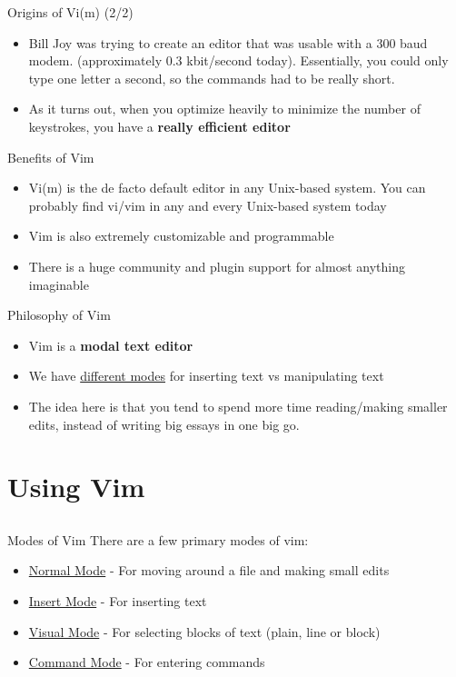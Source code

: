 \documentclass[12pt]{beamer}
\begin{document}
\begin{frame}{Origins of Vi(m) (2/2)}
    \begin{itemize}
        \item Bill Joy was trying to create an editor that was usable with a 300 baud modem. (approximately 0.3 kbit/second today). Essentially, you could only type one letter a second, so the commands had to be really short.
        \item As it turns out, when you optimize heavily to minimize the number of keystrokes, you have a
              \textbf{really efficient editor}
    \end{itemize}{}
\end{frame}{}

\begin{frame}{Benefits of Vim}
    \begin{itemize}
        \item Vi(m) is the de facto default editor in any Unix-based system. You can probably find vi/vim in
              any and every Unix-based system today
        \item Vim is also extremely customizable and programmable
        \item There is a huge community and plugin support for almost anything imaginable
    \end{itemize}{}
\end{frame}{}

\begin{frame}{Philosophy of Vim}
    \begin{itemize}
        \item Vim is a \textbf{modal text editor}
        \item We have \underline{different modes} for inserting text vs manipulating text
        \item The idea here is that you tend to spend more time reading/making smaller edits, instead of
              writing big essays in one big go.
    \end{itemize}{}
\end{frame}{}

\section{Using Vim}
\subsection{}

\begin{frame}{Modes of Vim}
    There are a few primary modes of vim:
    \begin{itemize}
        \item \underline{Normal Mode} - For moving around a file and making small edits
        \item \underline{Insert Mode} - For inserting text
        \item \underline{Visual Mode} - For selecting blocks of text (plain, line or block)
        \item \underline{Command Mode} - For entering commands
    \end{itemize}{}
\end{frame}{}
\end{document}
